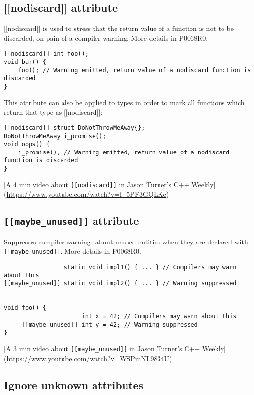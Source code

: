 \subsection{[[nodiscard]] attribute}

[[nodiscard]] is used to stress that the return value of a function is not to be discarded, on pain of a compiler warning. More details in P0068R0.

\begin{verbatim}
[[nodiscard]] int foo();
void bar() {
    foo(); // Warning emitted, return value of a nodiscard function is discarded
}
\end{verbatim}

This attribute can also be applied to types in order to mark all functions which return that type as [[nodiscard]]:

\begin{verbatim}
[[nodiscard]] struct DoNotThrowMeAway{};
DoNotThrowMeAway i_promise();
void oops() {
    i_promise(); // Warning emitted, return value of a nodiscard function is discarded
}
\end{verbatim}

[A 4 min video about \texttt{[[nodiscard]]} in Jason Turner’s C++ Weekly](\url{https://www.youtube.com/watch?v=l_5PF3GQLKc})

\subsection{\texttt{[[maybe_unused]]} attribute}

Suppresses compiler warnings about unused entities when they are declared with \texttt{[[maybe_unused]]}. More details in P0068R0.

\begin{verbatim}
                 static void impl1() { ... } // Compilers may warn about this
[[maybe_unused]] static void impl2() { ... } // Warning suppressed


void foo() {
                      int x = 42; // Compilers may warn about this
     [[maybe_unused]] int y = 42; // Warning suppressed
}
\end{verbatim}

[A 3 min video about \texttt{[[maybe_unused]]} in Jason Turner’s C++ Weekly](https://www.youtube.com/watch?v=WSPmNL9834U)

\subsection{Ignore unknown attributes}

